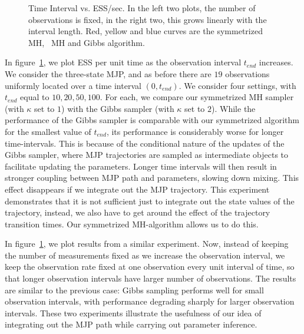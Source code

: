 {\begin{figure}
\begin{minipage}[hp]{0.24\linewidth}
  \end{minipage}
    \caption{Time Interval vs. ESS/sec. In the left two plots, the number of 
    observations is fixed, in the right two, this grows linearly with the
  interval length. Red, yellow and blue curves are the symmetrized MH,
  \naive\ MH and Gibbs algorithm.}
     \label{fig:TSS}
  \end{figure}
In figure~\ref{fig:TSS}, we plot ESS per unit time as the observation 
interval $t_{end}$ increases. We consider the three-state MJP, and as before there 
are $19$ observations uniformly located over a time interval $(0,t_{end})$. We 
consider four settings, with $t_{end}$ equal to $10, 20, 50, 100$. For each, we 
compare our symmetrized MH sampler (with $\kappa$ set to $1$) with the Gibbs 
sampler (with $\kappa$ set to $2$). While the performance of the Gibbs sampler 
is comparable with our symmetrized algorithm for the smallest value of 
$t_{end}$, its performance is considerably worse for longer time-intervals. This is 
because of the conditional nature of the updates of the Gibbs sampler, where MJP
trajectories are sampled as intermediate objects to facilitate updating the
parameters. Longer time intervals will then result in stronger coupling between 
MJP path and parameters, slowing down mixing. This effect disappears if we 
integrate out the MJP trajectory. This experiment demonstrates that it
is not sufficient just to integrate out the state values of the trajectory, 
instead, we also have to get around the effect of the
trajectory transition times. Our symmetrized MH-algorithm allows us to do
this. 


In figure~\ref{fig:TSS}, we plot results from a similar experiment. Now,
instead of keeping the number of measurements fixed as we increase the 
observation interval, we keep the observation rate fixed at one observation 
every unit interval of time, so that longer observation intervals have larger 
number of observations. The results are similar to the previous case: Gibbs 
sampling performs well for small observation intervals, with performance 
degrading sharply for larger observation intervals. These two experiments 
illustrate the usefulness of our idea of integrating out the MJP path while 
carrying out parameter inference.

}
